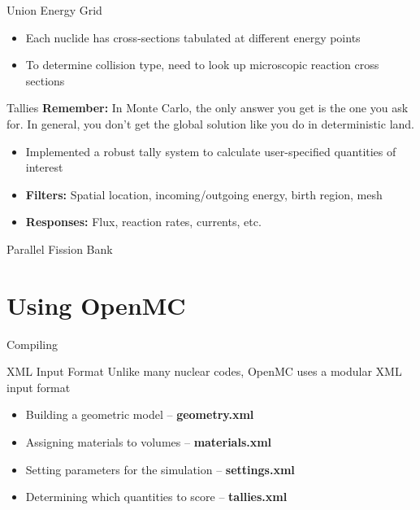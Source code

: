 \documentclass{beamer}
\begin{document}
\begin{frame}{Union Energy Grid}
  \begin{itemize}
  \item<1-> Each nuclide has cross-sections tabulated at different energy points
  \item<1-> To determine collision type, need to look up microscopic reaction
    cross sections
  \end{itemize}
  
\end{frame}

\begin{frame}{Tallies}{}
  {\bf Remember:} In Monte Carlo, the only answer you get is the one you ask
  for. In general, you don't get the global solution like you do in
  deterministic land.
  \begin{itemize}
  \item<1-> Implemented a robust tally system to calculate user-specified
    quantities of interest
  \item<1-> {\bf Filters:} Spatial location, incoming/outgoing energy, birth region, mesh
  \item<1-> {\bf Responses:} Flux, reaction rates, currents, etc.
  \end{itemize}
\end{frame}

\begin{frame}{Parallel Fission Bank}
\end{frame}

\section{Using OpenMC}

\begin{frame}{Compiling}
\end{frame}

\begin{frame}{XML Input Format}
  Unlike many nuclear codes, OpenMC uses a modular XML input format
  \begin{itemize}
  \item<1-> Building a geometric model -- {\bf geometry.xml}
  \item<1-> Assigning materials to volumes -- {\bf materials.xml}
  \item<1-> Setting parameters for the simulation -- {\bf settings.xml}
  \item<1-> Determining which quantities to score -- {\bf tallies.xml}
  \end{itemize}
\end{frame}
\end{document}
